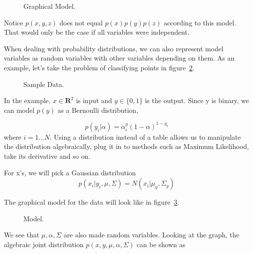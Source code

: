 \documentclass{ecctd01} %
\begin{document}
\begin{figure}[htpb]
\vspace{3.0cm}
\caption{\label{graph2} Graphical Model.}
\end{figure}

Notice $p(x,y,z)$ does not equal $p(x)p(y)p(z)$ according to this model. That
would only be the case if all variables were independent. 

When dealing with probability distributions, we can also represent model
variables as random variables with other variables depending on
them. As an example, let's take the problem of classifying points in
figure~\ref{gaussdata}. 

\begin{figure}[htpb]
\vspace{3.0cm}
\caption{\label{gaussdata} Sample Data.}
\end{figure}

In the example, $x \in \mathbf{R}^2$ is input and $y \in \{0,1\}$ is
the output. Since y is binary, we can model $p(y)$ as a Bernoulli
distribution, 

\begin{equation}
  p(y_{i}|\alpha)=\alpha^y_{i}(1-\alpha)^{1-y_{i}}
\end{equation}
where $i=1...N$. Using a distribution instead of a table
allows us to manipulate the distribution algebraically, plug it in to
methods such as Maximum Likelihood, take its derivative and so on. 

For x's, we will pick a Gaussian distribution
\begin{equation}
  \label{eq:p_x_y}
  p(x_{i}|y_{i},\mu,\Sigma)=N(x_{i}|\mu_{y},\Sigma_{y})  
\end{equation}

The graphical model for the data will look like in
figure~\ref{gauss_repl_plate}. 

\begin{figure}[htpb]
\vspace{3.0cm}
\caption{\label{gauss_repl_plate} Model.}
\end{figure}

We see that $\mu,\alpha,\Sigma$ are also made random variables. Looking at the
graph, the algebraic joint distribution $p(x,y,\mu,\alpha,\Sigma)$ can be shown
as 
\end{document}
